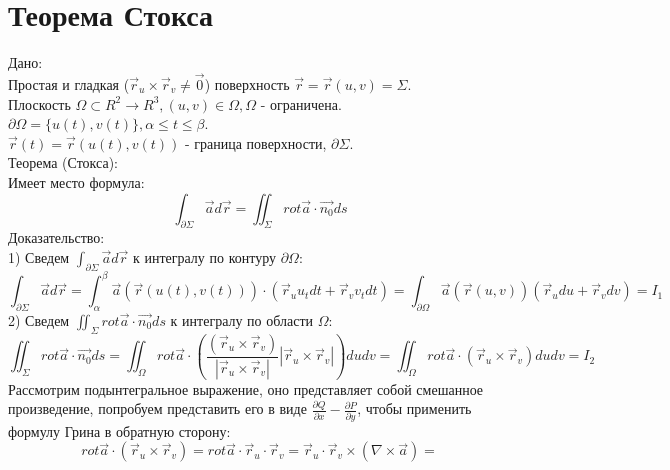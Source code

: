 \documentclass[12pt]{article}
\begin{document}
\section{Теорема Стокса}
Дано:\\
Простая и гладкая ($\overrightarrow{r}_u \times \overrightarrow{r}_v \neq \overrightarrow{0}$) поверхность $\overrightarrow{r} = \overrightarrow{r} (u,v) = \Sigma$.\\
Плоскость $\Omega \subset R^2 \to R^3, (u,v) \in \Omega, \Omega$ - ограничена.\\
$\partial \Omega = \{ u(t), v(t) \}, \alpha \leq t \leq \beta$.\\
$\overrightarrow{r}(t) = \overrightarrow{r}(u(t),v(t))$ - граница поверхности, $\partial \Sigma$.\\
Теорема (Стокса):\\
Имеет место формула:\\
$$\int_{\partial \Sigma} \overrightarrow{a} d \overrightarrow{r} = \iint_{\Sigma} rot \overrightarrow{a} \cdot \overrightarrow{n_0} ds$$
Доказательство:\\
1) Сведем $\int_{\partial \Sigma} \overrightarrow{a} d \overrightarrow{r}$ к интегралу по контуру $\partial \Omega$:\\
$$\int_{\partial \Sigma} \overrightarrow{a} d \overrightarrow{r} = \int_{\alpha}^{\beta} \overrightarrow{a} (\overrightarrow{r}(u(t),v(t))) \cdot (\overrightarrow{r}_u u_t dt + \overrightarrow{r}_v v_t dt) = \int_{\partial \Omega} \overrightarrow{a} (\overrightarrow{r}(u,v)) (\overrightarrow{r}_u du + \overrightarrow{r}_v dv) = I_1$$
2) Сведем $\iint_{\Sigma} rot \overrightarrow{a} \cdot \overrightarrow{n_0} ds$ к интегралу по области $\Omega$:\\
$$\iint_{\Sigma} rot \overrightarrow{a} \cdot \overrightarrow{n_0} ds = \iint_{\Omega} rot \overrightarrow{a} \cdot (\frac{(\overrightarrow{r}_u \times \overrightarrow{r}_v)}{|\overrightarrow{r}_u \times \overrightarrow{r}_v|} |\overrightarrow{r}_u \times \overrightarrow{r}_v|) du dv = \iint_{\Omega} rot \overrightarrow{a} \cdot (\overrightarrow{r}_u \times \overrightarrow{r}_v) du dv = I_2$$
Рассмотрим подынтегральное выражение, оно представляет собой смешанное произведение, попробуем представить его в виде $\frac{\partial Q}{\partial x} - \frac{\partial P}{\partial y}$, чтобы применить формулу Грина в обратную сторону:\\
$$rot \overrightarrow{a} \cdot (\overrightarrow{r}_u \times \overrightarrow{r}_v) = rot \overrightarrow{a} \cdot \overrightarrow{r}_u \cdot \overrightarrow{r}_v = \overrightarrow{r}_u \cdot \overrightarrow{r}_v \times (\nabla \times \overrightarrow{a}) =$$
\end{document}
